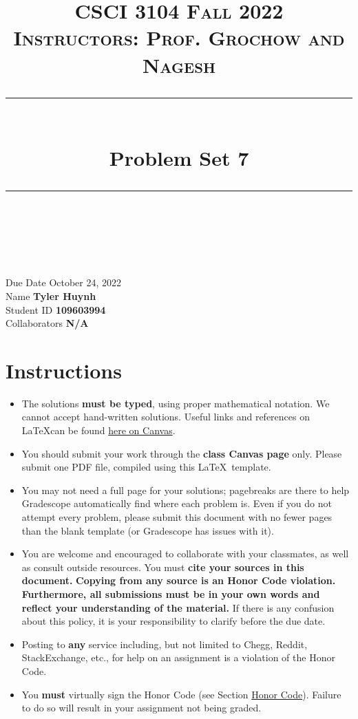 \documentclass[11pt]{article}
\title{
\normalfont \normalsize 
\textsc{CSCI 3104 Fall 2022 \\ 
Instructors: Prof. Grochow and Nagesh} \\
[10pt] 
\rule{\linewidth}{0.5pt} \\[6pt] 
\huge Problem Set 7 \\
\rule{\linewidth}{2pt}  \\[10pt]
}
\date{}
\theoremstyle{definition}
\theoremstyle{definition}
\theoremstyle{definition}
\begin{document}

\maketitle


\noindent
Due Date \dotfill October 24, 2022 \\
Name \dotfill \textbf{Tyler Huynh} \\
Student ID \dotfill \textbf{109603994} \\
Collaborators \dotfill \textbf{N/A}

\renewcommand{\thesubsection}{\arabic{section}(\alph{subsection}). }

\tableofcontents

\section*{Instructions}
 \begin{itemize}
	\item The solutions \textbf{must be typed}, using proper mathematical notation. We cannot accept hand-written solutions. Useful links and references on \LaTeX can be found \href{https://canvas.colorado.edu/courses/75824/pages/latex}{here on Canvas}.
	\item You should submit your work through the \textbf{class Canvas page} only. Please submit one PDF file, compiled using this \LaTeX \ template.
	\item You may not need a full page for your solutions; pagebreaks are there to help Gradescope automatically find where each problem is. Even if you do not attempt every problem, please submit this document with no fewer pages than the blank template (or Gradescope has issues with it).

	\item You are welcome and encouraged to collaborate with your classmates, as well as consult outside resources. You must \textbf{cite your sources in this document.} \textbf{Copying from any source is an Honor Code violation. Furthermore, all submissions must be in your own words and reflect your understanding of the material.} If there is any confusion about this policy, it is your responsibility to clarify before the due date. 

	\item Posting to \textbf{any} service including, but not limited to Chegg, Reddit, StackExchange, etc., for help on an assignment is a violation of the Honor Code.

	\item You \textbf{must} virtually sign the Honor Code (see Section \hyperlink{HonorCode}{Honor Code}). Failure to do so will result in your assignment not being graded.
\end{itemize}
\end{document}
